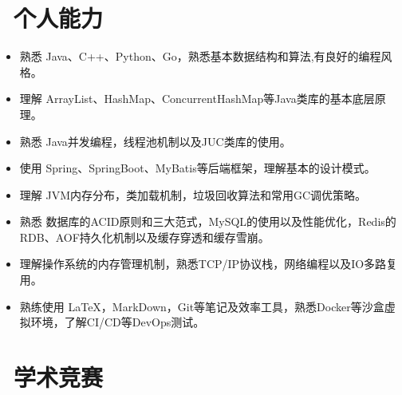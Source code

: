 \documentclass{resume}
\begin{document}
\vspace{-1.5ex}

\section{\faCogs\ 个人能力}
\begin{itemize}[parsep=0.5ex]
  \item 熟悉 Java、C++、Python、Go，熟悉基本数据结构和算法,有良好的编程风格。
  \item 理解 ArrayList、HashMap、ConcurrentHashMap等Java类库的基本底层原理。
  \item 熟悉 Java并发编程，线程池机制以及JUC类库的使用。
  \item 使用 Spring、SpringBoot、MyBatis等后端框架，理解基本的设计模式。
  \item 理解 JVM内存分布，类加载机制，垃圾回收算法和常用GC调优策略。
  \item 熟悉 数据库的ACID原则和三大范式，MySQL的使用以及性能优化，Redis的RDB、AOF持久化机制以及缓存穿透和缓存雪崩。
  \item 理解操作系统的内存管理机制，熟悉TCP/IP协议栈，网络编程以及IO多路复用。
  \item 熟练使用 \LaTeX，MarkDown，Git等笔记及效率工具，熟悉Docker等沙盒虚拟环境，了解CI/CD等DevOps测试。
\end{itemize}

\vspace{-1ex}
\vspace{-1ex}

\section{\faTrophy\ 学术竞赛}



%
%
\end{document}
